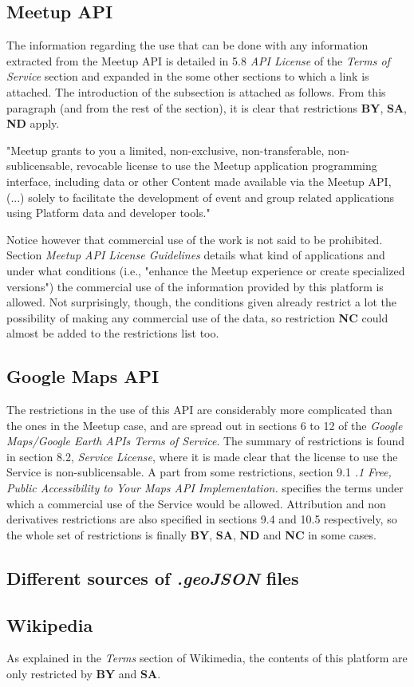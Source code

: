 \subsection{Meetup API}

The information regarding the use that can be done with any information extracted from the Meetup API is detailed in 5.8 \textit{API License} of the \textit{Terms of Service} section and expanded in the some other sections to which a link is attached. The introduction of the subsection is attached as follows. From this paragraph (and from the rest of the section), it is clear that restrictions \textbf{BY}, \textbf{SA}, \textbf{ND} apply.

\vspace{0.5cm}
"Meetup grants to you a limited, non-exclusive, non-transferable, non-sublicensable, revocable license to use the Meetup application programming interface, including data or other Content made available via the Meetup API, (...) solely to facilitate the development of event and group related applications using Platform data and developer tools."
\vspace{0.5cm}

Notice however that commercial use of the work is not said to be prohibited. Section \textit{Meetup API License Guidelines} details what kind of applications and under what conditions (i.e., "enhance the Meetup experience or create specialized versions") the commercial use of the information provided by this platform is allowed. Not surprisingly, though, the conditions given already restrict a lot the possibility of making any commercial use of the data, so restriction \textbf{NC} could almost be added to the restrictions list too.

\subsection{Google Maps API}

The restrictions in the use of this API are considerably more complicated than the ones in the Meetup case, and are spread out in sections 6 to 12 of the \textit{Google Maps/Google Earth APIs Terms of Service}. The summary of restrictions is found in section 8.2, \textit{Service License}, where it is made clear that the license to use the Service is non-sublicensable. A part from some restrictions, section 9.1 \textit{.1 Free, Public Accessibility to Your Maps API Implementation.} specifies the terms under which a commercial use of the Service would be allowed. Attribution and non derivatives restrictions are also specified in sections 9.4 and 10.5 respectively, so the whole set of restrictions is finally  \textbf{BY}, \textbf{SA}, \textbf{ND} and \textbf{NC} in some cases.

\subsection{Different sources of \textit{.geoJSON} files}



\subsection{Wikipedia}

As explained in the \textit{Terms} section of Wikimedia, the contents of this platform are only restricted by \textbf{BY} and \textbf{SA}.
